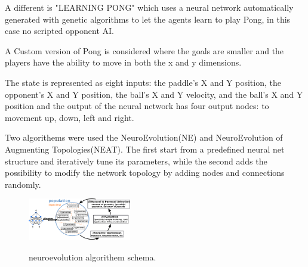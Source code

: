 A different is "LEARNING PONG" which uses a neural network automatically generated with genetic algorithms to let the agents learn to play Pong, in this case no scripted opponent AI.

A Custom version of Pong is considered where the goals are smaller and the players have the ability to move in both the x and y dimensions.

The state is represented as eight inputs: the paddle's X and Y position, the opponent's X and Y position, the ball's X and Y velocity,
and the ball's X and Y position and the output of the neural network has four output nodes: to movement up, down, left and right.

Two algorithems were used the NeuroEvolution(NE) and NeuroEvolution of Augmenting Topologies(NEAT).
The first start from a predefined neural net structure and iteratively tune its parameters, while the second adds the possibility to modify the network topology by adding nodes and connections randomly.



\begin{figure}[ht]
    \centering
    \includegraphics[width=0.4\textwidth]{images/neuroevolution.png}
    \label{ne}
    \caption{neuroevolution algorithem schema.}
\end{figure}
